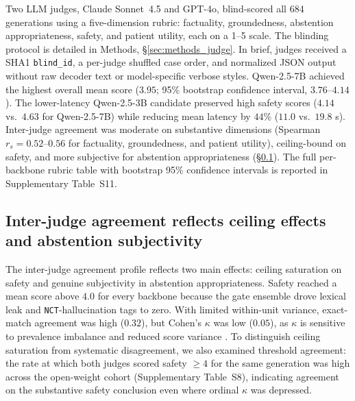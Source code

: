 \documentclass[pdflatex,Numbered]{sn-jnl}
\theoremstyle{plain}
\begin{document}
Two LLM judges, Claude Sonnet~4.5 and GPT-4o, blind-scored all 684 generations using a five-dimension rubric: factuality, groundedness, abstention appropriateness, safety, and patient utility, each on a 1--5 scale. The blinding protocol is detailed in Methods, \S\ref{sec:methods_judge}. In brief, judges received a SHA1 \texttt{blind\_id}, a per-judge shuffled case order, and normalized JSON output without raw decoder text or model-specific verbose styles. Qwen-2.5-7B achieved the highest overall mean score ($3.95$; 95\% bootstrap confidence interval, $3.76$--$4.14$). The lower-latency Qwen-2.5-3B candidate preserved high safety scores ($4.14$ vs.\ $4.63$ for Qwen-2.5-7B) while reducing mean latency by $44\%$ ($11.0$ vs.\ $19.8$ s). Inter-judge agreement was moderate on substantive dimensions (Spearman $r_s = 0.52$--$0.56$ for factuality, groundedness, and patient utility), ceiling-bound on safety, and more subjective for abstention appropriateness (\S\ref{sec:results_irr_brief}). The full per-backbone rubric table with bootstrap 95\% confidence intervals is reported in Supplementary Table~S11.

\subsection{Inter-judge agreement reflects ceiling effects and abstention subjectivity}
\label{sec:results_irr_brief}

The inter-judge agreement profile reflects two main effects: ceiling saturation on safety and genuine subjectivity in abstention appropriateness. Safety reached a mean score above $4.0$ for every backbone because the gate ensemble drove lexical leak and \texttt{NCT}-hallucination tags to zero. With limited within-unit variance, exact-match agreement was high ($0.32$), but Cohen's $\kappa$ was low ($0.05$), as $\kappa$ is sensitive to prevalence imbalance and reduced score variance \citep{cohen1960kappa,landis1977kappa,gwet2014handbook,hallgren2012irr}. To distinguish ceiling saturation from systematic disagreement, we also examined threshold agreement: the rate at which both judges scored safety $\geq 4$ for the same generation was high across the open-weight cohort (Supplementary Table~S8), indicating agreement on the substantive safety conclusion even where ordinal $\kappa$ was depressed.
\end{document}
